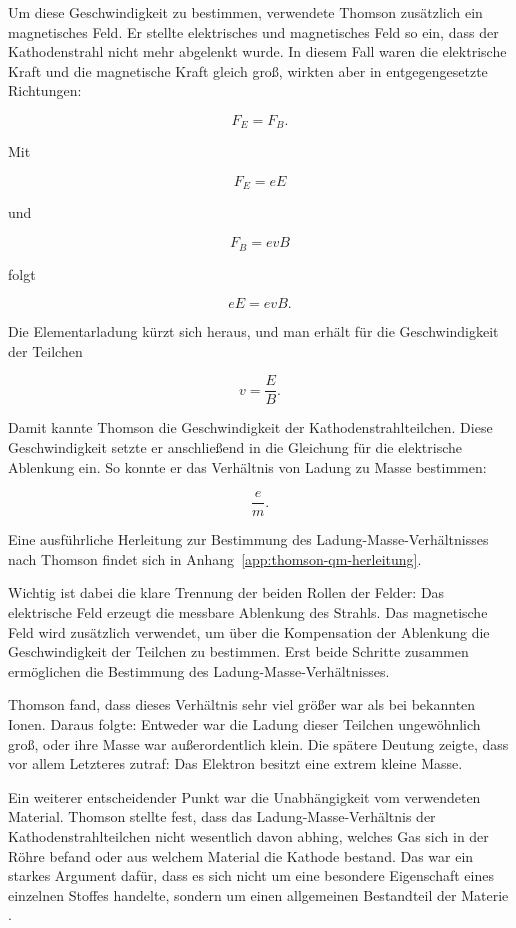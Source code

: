 Um diese Geschwindigkeit zu bestimmen, verwendete Thomson zusätzlich ein
magnetisches Feld. Er stellte elektrisches und magnetisches Feld so ein, dass
der Kathodenstrahl nicht mehr abgelenkt wurde. In diesem Fall waren die
elektrische Kraft und die magnetische Kraft gleich groß, wirkten aber in
entgegengesetzte Richtungen:

\[
F_E = F_B.
\]

Mit

\[
F_E = eE
\]

und

\[
F_B = evB
\]

folgt

\[
eE = evB.
\]

Die Elementarladung kürzt sich heraus, und man erhält für die Geschwindigkeit
der Teilchen

\[
v = \frac{E}{B}.
\]

Damit kannte Thomson die Geschwindigkeit der Kathodenstrahlteilchen. Diese
Geschwindigkeit setzte er anschließend in die Gleichung für die elektrische
Ablenkung ein. So konnte er das Verhältnis von Ladung zu Masse bestimmen:

\[
\frac{e}{m}.
\]

Eine ausführliche Herleitung zur Bestimmung des Ladung-Masse-Verhältnisses
nach Thomson findet sich in
Anhang~\ref{app:thomson-qm-herleitung}.

Wichtig ist dabei die klare Trennung der beiden Rollen der Felder:
Das elektrische Feld erzeugt die messbare Ablenkung des Strahls. Das
magnetische Feld wird zusätzlich verwendet, um über die Kompensation der
Ablenkung die Geschwindigkeit der Teilchen zu bestimmen. Erst beide Schritte
zusammen ermöglichen die Bestimmung des Ladung-Masse-Verhältnisses.

Thomson fand, dass dieses Verhältnis sehr viel größer war als bei bekannten
Ionen. Daraus folgte: Entweder war die Ladung dieser Teilchen
ungewöhnlich groß, oder ihre Masse war außerordentlich klein. Die spätere
Deutung zeigte, dass vor allem Letzteres zutraf: Das Elektron besitzt eine
extrem kleine Masse.

Ein weiterer entscheidender Punkt war die Unabhängigkeit vom verwendeten
Material. Thomson stellte fest, dass das Ladung-Masse-Verhältnis der
Kathodenstrahlteilchen nicht wesentlich davon abhing, welches Gas sich in der
Röhre befand oder aus welchem Material die Kathode bestand. Das war ein starkes
Argument dafür, dass es sich nicht um eine besondere Eigenschaft eines einzelnen
Stoffes handelte, sondern um einen allgemeinen Bestandteil der Materie
.

